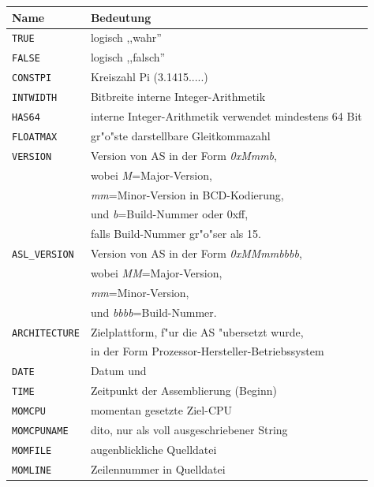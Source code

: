 \documentclass[12pt,a4paper,twoside]{report}
\newcommand{\tty}[1]{{\tt #1}}
\newcommand{\asname}{AS}
\begin{document}
\begin{table}[p]
\begin{center}\begin{tabular}{|l|l|}
\hline
Name             & Bedeutung \\
\hline
\hline
\tty{TRUE}             & logisch ,,wahr'' \\
\tty{FALSE}            & logisch ,,falsch'' \\
\tty{CONSTPI}          & Kreiszahl Pi (3.1415.....) \\
\tty{INTWIDTH}         & Bitbreite interne Integer-Arithmetik \\
\tty{HAS64}            & interne Integer-Arithmetik verwendet mindestens 64 Bit \\
\tty{FLOATMAX}         & gr"o"ste darstellbare Gleitkommazahl \\
\tty{VERSION}          & Version von \asname{} in der Form {\em 0xMmmb}, \\
                       & wobei {\em M}=Major-Version, \\
                       & {\em mm}=Minor-Version in BCD-Kodierung, \\
                       & und {\em b}=Build-Nummer oder 0xff, \\
                       & falls Build-Nummer gr"o"ser als 15. \\
\tty{ASL\_VERSION}     & Version von \asname{} in der Form {\em 0xMMmmbbbb}, \\
                       & wobei {\em MM}=Major-Version, \\
                       & {\em mm}=Minor-Version, \\
                       & und {\em bbbb}=Build-Nummer. \\
\tty{ARCHITECTURE}     & Zielplattform, f"ur die \asname{} "ubersetzt wurde, \\
                       & in der Form Prozessor-Hersteller-Betriebssystem \\
\tty{DATE}             & Datum und \\
\tty{TIME}             & Zeitpunkt der Assemblierung (Beginn) \\
\tty{MOMCPU}           & momentan gesetzte Ziel-CPU \\
\tty{MOMCPUNAME}       & dito, nur als voll ausgeschriebener String \\
\tty{MOMFILE}          & augenblickliche Quelldatei \\
\tty{MOMLINE}          & Zeilennummer in Quelldatei \\

\end{tabular}
\end{center}
\end{table}
\end{document}
